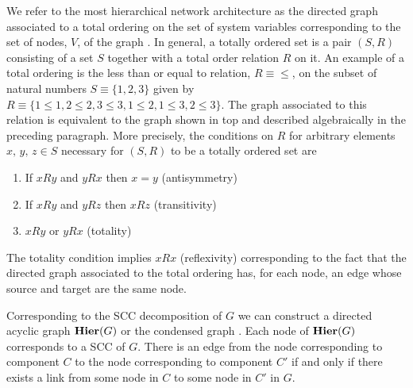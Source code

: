  We refer to the most hierarchical network architecture as the directed graph associated to a total ordering on the set of system variables corresponding to the set of nodes, $V$, of the graph \cite{Cormen2009}. In general, a totally ordered set is a pair $(S,R)$ consisting of a set $S$ together with a total order relation $R$ on it. An example of a total ordering is the less than or equal to relation, $R \equiv \leq$, on the subset of natural numbers $S \equiv \{1,2,3\}$ given by $R \equiv \{1 \leq 1, 2 \leq 2, 3 \leq 3, 1 \leq 2, 1 \leq 3, 2 \leq 3\}$. The graph associated to this relation is equivalent to the graph shown in  top and described algebraically in the preceding paragraph. More precisely, the conditions on $R$ for arbitrary elements $x,\,y,\,z \in S$ necessary for $(S,R)$ to be a totally ordered set are
\begin{enumerate}
\item If $x R y$ and $y R x$ then $x=y$ (antisymmetry)
\item If $x R y$ and $y R z$ then $x R z$ (transitivity)
\item $x R y$ or $y R x$ (totality)
\end{enumerate}
The totality condition implies $x R x$ (reflexivity) corresponding to the fact that the directed graph associated to the total ordering has, for each node, an edge whose source and target are the same node.

Corresponding to the SCC decomposition of $G$ we can construct a directed acyclic graph $\mathbf{Hier} (G)$ or the condensed graph \cite{Corominas-Murtra2013}.  Each node of $\mathbf{Hier} (G)$ corresponds to a SCC of $G$. There is an edge from the node corresponding to component $C$ to the node corresponding to component $C'$ if and only if there exists a link from some node in $C$ to some node in $C'$ in $G$.



